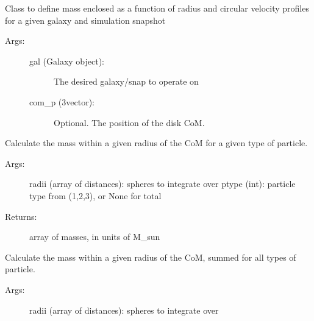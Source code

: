 \documentclass[letterpaper,10pt,english]{sphinxmanual}
\begin{document}
\begin{fulllineitems}
\label{\detokenize{massprofile:galaxy.massprofile.MassProfile}}
Class to define mass enclosed as a function of radius and circular velocity
profiles for a given galaxy and simulation snapshot
\begin{description}
\item[{Args:}] \leavevmode\begin{description}
\item[{gal (Galaxy object):}] \leavevmode
The desired galaxy/snap to operate on

\item[{com\_p (3\sphinxhyphen{}vector):}] \leavevmode
Optional. The position of the disk CoM.

\end{description}

\end{description}

\begin{fulllineitems}
\label{\detokenize{massprofile:galaxy.massprofile.MassProfile.mass_enclosed}}
Calculate the mass within a given radius of the CoM 
for a given type of particle.
\begin{description}
\item[{Args:}] \leavevmode
radii (array of distances): spheres to integrate over
ptype (int): particle type from (1,2,3), or None for total

\item[{Returns:}] \leavevmode
array of masses, in units of M\_sun

\end{description}

\end{fulllineitems}


\begin{fulllineitems}
\label{\detokenize{massprofile:galaxy.massprofile.MassProfile.mass_enclosed_total}}
Calculate the mass within a given radius of the CoM, 
summed for all types of particle.
\begin{description}
\item[{Args:}] \leavevmode
radii (array of distances): spheres to integrate over


\end{description}
\end{fulllineitems}
\end{fulllineitems}
\end{document}
